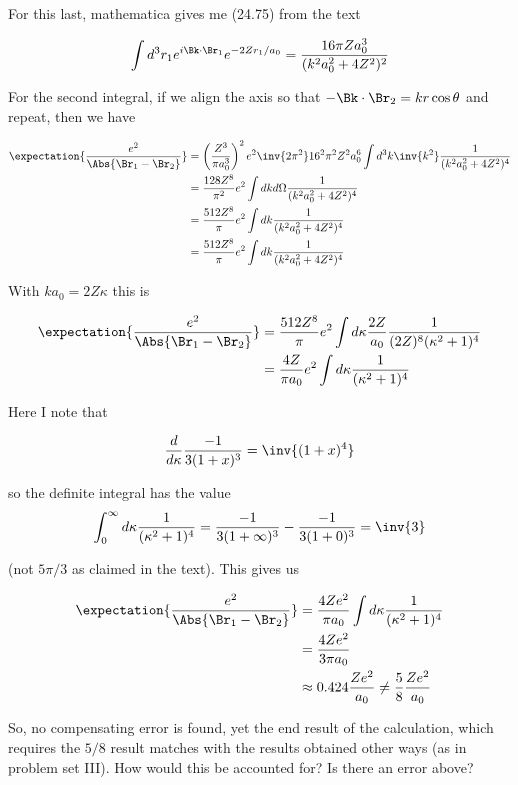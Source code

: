 For this last, mathematica gives me (24.75) from the text

\begin{equation}\label{eqn:qmTwoL6:n}
\int 
d^3 r_1 
e^{i \Bk \cdot \Br_1 } e^{ -2 Z r_1 /a_0} 
=
\frac{ 16 \pi Z a_0^3 }{(k^2 a_0^2 + 4 Z^2)^2}
\end{equation}

For the second integral, if we align the axis so that $-\Bk \cdot \Br_2 = k r \cos\theta$ and repeat, then we have

\begin{align*}
\expectation{\frac{e^2}{\Abs{\Br_1 - \Br_2}}}
&=
\left( \frac{Z^3}{\pi a_0^3}\right)^2 e^2
\inv{2 \pi^2} 
16^2 \pi^2 Z^2 a_0^6 
\int d^3 k \inv{k^2}
\frac{ 1 }{(k^2 a_0^2 + 4 Z^2)^4} \\
&=
\frac{128 Z^8}{\pi^2 } e^2
\int dk d\Omega 
\frac{ 1 }{(k^2 a_0^2 + 4 Z^2)^4} \\
&=
\frac{512 Z^8}{\pi} e^2
\int dk 
\frac{ 1 }{(k^2 a_0^2 + 4 Z^2)^4} \\
&=
\frac{512 Z^8}{\pi} e^2
\int dk 
\frac{ 1 }{(k^2 a_0^2 + 4 Z^2)^4} \\
\end{align*}

With $k a_0 = 2 Z \kappa$ this is

\begin{align*}
\expectation{\frac{e^2}{\Abs{\Br_1 - \Br_2}}}
&=
\frac{512 Z^8}{\pi} e^2
\int d\kappa 
\frac{ 2 Z }{a_0}
\frac{ 1 }{(2 Z)^8 (\kappa^2 + 1)^4} \\
&=
\frac{4 Z}{\pi a_0} e^2
\int d\kappa 
\frac{ 1 }{(\kappa^2 + 1)^4} \\
\end{align*}

Here I note that 

\begin{align*}
\frac{d}{d\kappa}
\frac{-1}{ 3 (1+x)^3 }
=
\inv{ (1+x)^4 }
\end{align*}

so the definite integral has the value
\begin{align*}
\int_0^\infty d\kappa 
\frac{ 1 }{ (\kappa^2 + 1)^4} 
=
\frac{-1}{ 3 (1+\infty)^3 }
-
\frac{-1}{ 3 (1+0)^3 }
= \inv{3}
\end{align*}

(not $5 \pi/3$ as claimed in the text).  This gives us

\begin{align*}
\expectation{\frac{e^2}{\Abs{\Br_1 - \Br_2}}}
&=
\frac{4 Z e^2} { \pi a_0 } 
\int d\kappa 
\frac{ 1 }{(\kappa^2 + 1)^4} \\
&=
\frac{4 Z e^2} { 3 \pi a_0 }  \\
&\approx 0.424 \frac{Z e^2 }{a_0} \ne \frac{5}{8} \frac{Z e^2 }{a_0}
\end{align*}

So, no compensating error is found, yet the end result of the calculation, which requires the $5/8$ result matches with the results obtained other ways (as in problem set III).  How would this be accounted for?  Is there an error above?

\EndArticle
